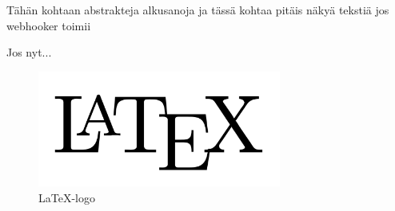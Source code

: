 \documentclass[12pt]{report} %
\begin{document}
    Tähän kohtaan abstrakteja alkusanoja ja tässä kohtaa pitäis näkyä tekstiä jos webhooker toimii

    Jos nyt...

    \begin{figure}[H] %
        \centering
        \includegraphics[width=8cm]{latex.png}
        \caption{\LaTeX -logo} %
        \label{img:myimg.jpg} %
        \end{figure}
    


    
    
    

    \printglossaries

    \appendix

    
    
    
\end{document}
